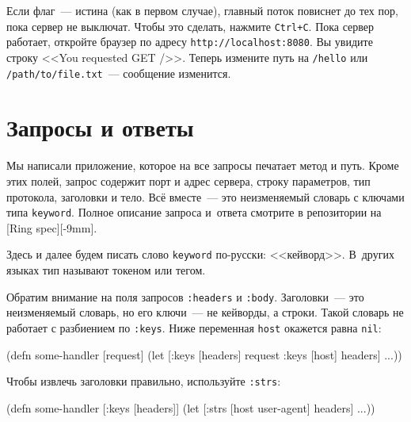\fi

Если флаг~--- истина (как в первом случае), главный поток повиснет до тех пор, пока
сервер не выключат. Чтобы это сделать, нажмите \verb|Ctrl+C|. Пока сервер
работает, откройте браузер по адресу \verb|http://localhost:8080|. Вы увидите
строку <<You requested GET />>. Теперь измените путь на \verb|/hello| или
\verb|/path/to/file.txt|~--- сообщение изменится.

\section{Запросы и ответы}

Мы написали приложение, которое на все запросы печатает метод и путь. Кроме этих
полей, запрос содержит порт и адрес сервера, строку параметров, тип протокола,
заголовки и тело. Всё вместе~--- это неизменяемый словарь с ключами типа
\verb|keyword|. Полное описание запроса и~ответа смотрите в репозитории на
[Ring spec][-9mm].

Здесь и далее будем писать слово \verb|keyword| по-русски:
<<кейворд>>. В~других языках тип называют токеном или тегом.


Обратим внимание на поля запросов \verb|:headers| и \verb|:body|. Заголовки~---
это неизменяемый словарь, но его ключи~--- не кейворды, а строки. Такой словарь не
работает с разбиением по \verb|:keys|. Ниже переменная \verb|host| окажется
равна \verb|nil|:


\begin{english}
  \begin{clojure}
(defn some-handler
  [request]
  (let [{:keys [headers]} request
        {:keys [host]} headers]
    ...))
  \end{clojure}
\end{english}


Чтобы извлечь заголовки правильно, используйте \verb|:strs|:

\ifx\devicetype\mobile

\begin{english}
  \begin{clojure}
(defn some-handler
  [{:keys [headers]}]
  (let [{:strs [host
                user-agent]} headers]
    ...))
  \end{clojure}
\end{english}

